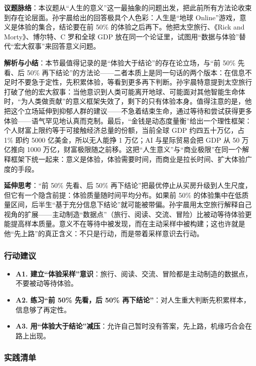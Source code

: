 \textbf{议题脉络}：本议题从``人生的意义''这一最抽象的问题出发，把此前所有方法论收束到存在论层面。孙宇晨给出的回答极具个人色彩：人生是``地球
Online''游戏，意义是体验的集合，结论要在前 50\%
的体验之后再下。他把太空旅行、《Rick and Morty》、博尔特、C 罗和全球 GDP
放在同一个论证里，试图用``数据与体验''替代``宏大叙事''来回答意义问题。

\textbf{解析与小结}：本节最值得记录的是``体验大于结论''的存在论立场，与``前
50\% 先看、后 50\%
再下结论''的方法论------二者本质上是同一句话的两个版本：在信息不足时不要急于定性，先积累体验，等看到更多再下判断。孙宇晨特意提到太空旅行打破了他的宏大叙事：当他意识到人类可能离开地球、可能面对其他智能生命体时，``为人类做贡献''的意义框架失效了，剩下的只有体验本身。值得注意的是，他把这个立场延伸到抑郁人群的建议------不急着结束生命，通过等待和尝试获得更多体验------语气罕见地认真而克制。最后，``金钱是动态度量衡''给出一个理性框架：个人财富上限约等于可接触经济总量的份额，当前全球
GDP 约四五十万亿，占 1\% 即约 5000 亿美金，所以无人能挣 1 万亿；AI
与星际贸易会把 GDP 从 50 万亿推向 1000
万亿，财富极限随之前移。这把``人生意义''与``商业极限''在同一个解释框架下统一起来：意义是体验，体验需要时间，而商业是拉长时间、扩大体验广度的手段。

\textbf{延伸思考}：``前 50\% 先看、后 50\%
再下结论''把最优停止从买房升级到人生尺度，但它有一个隐含前提：体验质量随时间平均分布。如果前
50\%
的体验集中在低质量区间，后半生``基于充分信息下结论''就可能被带偏。孙宇晨用太空旅行解释自己视角的扩展------主动制造``数据点''（旅行、阅读、交流、冒险）比被动等待体验更能提高样本质量。意义不在等待中被发现，而在主动采样中被构建；这也许就是他``先上路''的真正含义：不只是行动，而是带着采样意识去行动。

\subsubsection{行动建议}

\begin{itemize}
\tightlist
\item
  \textbf{A1.
  建立``体验采样''意识}：旅行、阅读、交流、冒险都是主动制造的数据点，不要被动等待体验。
\item
  \textbf{A2. 练习``前 50\% 先看，后 50\%
  再下结论''}：对人生重大判断先积累样本，信息够了再定性。
\item
  \textbf{A3.
  用``体验大于结论''减压}：允许自己暂时没有答案，先上路，机缘巧合会在路上出现。
\end{itemize}

\subsubsection{实践清单}

